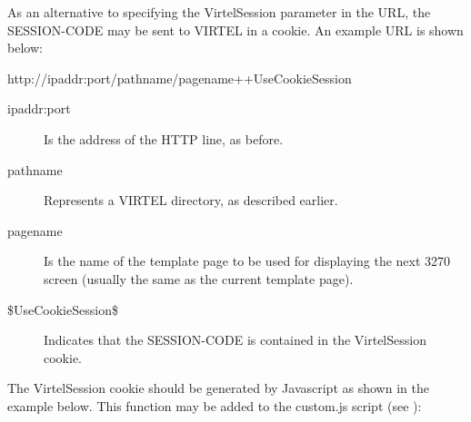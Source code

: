 \documentclass[letterpaper,10pt,english]{sphinxmanual}
\begin{document}

As an alternative to specifying the VirtelSession parameter in the URL, the SESSION-CODE may be sent to VIRTEL in a cookie. An example URL is shown below:

\begin{sphinxVerbatim}[commandchars=\\\{\}]
http://ipaddr:port/pathname/pagename++\PYGZdl{}UseCookieSession\PYGZdl{}
\end{sphinxVerbatim}
\begin{description}
\item[{ipaddr:port}] \leavevmode
Is the address of the HTTP line, as before.

\item[{pathname}] \leavevmode
Represents a VIRTEL directory, as described earlier.

\item[{pagename}] \leavevmode
Is the name of the template page to be used for displaying the next
3270 screen (usually the same as the current template page).

\item[{\$UseCookieSession\$}] \leavevmode
Indicates that the SESSION-CODE is contained in the VirtelSession cookie.

\end{description}

The VirtelSession cookie should be generated by Javascript as shown in the example below. This function may be added to the custom.js script (see {\hyperref[\detokenize{User_Guide:v457ug-customization-javascript-functions}]{}}):

\begin{sphinxVerbatim}[commandchars=\\\{\}]
         
    
   
  
         
       
      
\end{sphinxVerbatim}
\end{document}
